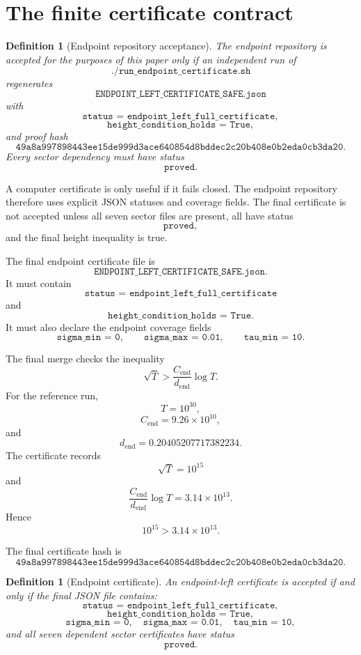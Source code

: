 \documentclass[11pt]{article}
\newtheorem{definition}[theorem]{Definition}
\newcommand{\Cend}{C_{\mathrm{end}}}
\newcommand{\dend}{d_{\mathrm{end}}}
\begin{document}
\section{The finite certificate contract}

\begin{definition}[Endpoint repository acceptance]
The endpoint repository is accepted for the purposes of this paper only if an
independent run of
\[
\texttt{./run\_endpoint\_certificate.sh}
\]
regenerates
\[
\texttt{ENDPOINT\_LEFT\_CERTIFICATE\_SAFE.json}
\]
with
\[
\texttt{status = endpoint\_left\_full\_certificate},
\]
\[
\texttt{height\_condition\_holds = True},
\]
and proof hash
\[
\texttt{49a8a997898443ee15de999d3ace640854d8bddec2c20b408e0b2eda0cb3da20}.
\]
Every sector dependency must have status
\[
\texttt{proved}.
\]
\end{definition}

A computer certificate is only useful if it fails closed.  The endpoint repository therefore uses explicit JSON statuses and coverage fields.  The final certificate is not accepted unless all seven sector files are present, all have status
\[
\texttt{proved},
\]
and the final height inequality is true.

The final endpoint certificate file is
\[
\texttt{ENDPOINT\_LEFT\_CERTIFICATE\_SAFE.json}.
\]
It must contain
\[
\texttt{status = endpoint\_left\_full\_certificate}
\]
and
\[
\texttt{height\_condition\_holds = True}.
\]
It must also declare the endpoint coverage fields
\[
\texttt{sigma\_min = 0},
\qquad
\texttt{sigma\_max = 0.01},
\qquad
\texttt{tau\_min = 10}.
\]

The final merge checks the inequality
\[
\sqrt{T}>
\frac{\Cend}{\dend}\log T.
\]
For the reference run,
\[
T=10^{30},
\]
\[
\Cend
=
9.26\times10^{10},
\]
and
\[
\dend=0.20405207717382234.
\]
The certificate records
\[
\sqrt{T}=10^{15}
\]
and
\[
\frac{\Cend}{\dend}\log T
=
3.14\times10^{13}.
\]
Hence
\[
10^{15}
>
3.14\times10^{13}.
\]

The final certificate hash is
\[
\texttt{49a8a997898443ee15de999d3ace640854d8bddec2c20b408e0b2eda0cb3da20}.
\]

\begin{definition}[Endpoint certificate]
An endpoint-left certificate is accepted if and only if the final JSON file contains:
\[
\texttt{status = endpoint\_left\_full\_certificate},
\]
\[
\texttt{height\_condition\_holds = True},
\]
\[
\texttt{sigma\_min = 0},
\quad
\texttt{sigma\_max = 0.01},
\quad
\texttt{tau\_min = 10},
\]
and all seven dependent sector certificates have status
\[
\texttt{proved}.
\]
\end{definition}
\end{document}
